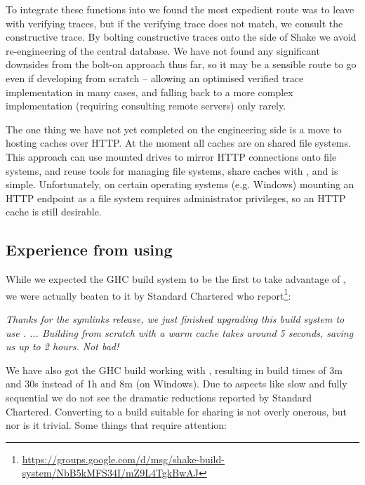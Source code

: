 To integrate these functions into \Shake we found the most expedient route was
to leave \Shake with verifying traces, but if the verifying trace does not
match, we consult the constructive trace. By bolting constructive traces onto
the side of Shake we avoid re-engineering of the central database. We have not
found any significant downsides from the bolt-on approach thus far, so it may be
a sensible route to go even if developing from scratch -- allowing an optimised
verified trace implementation in many cases, and falling back to a more complex
implementation (requiring consulting remote servers) only rarely.

The one thing we have not yet completed on the engineering side is a move to
hosting caches over HTTP. At the moment all caches are on shared file systems.
This approach can use mounted drives to mirror HTTP connections onto file
systems, and reuse tools for managing file systems, share caches with
, and is simple. Unfortunately, on certain operating systems (e.g.
Windows) mounting an HTTP endpoint as a file system requires administrator
privileges, so an HTTP cache is still desirable.

\subsection{Experience from using \Cloud \Shake}\label{sec-using-cloud-shake}

While we expected the GHC build system to be the first to take advantage of
\Cloud \Shake, we were actually beaten to it by Standard Chartered who
report\footnote{\url{https://groups.google.com/d/msg/shake-build-system/NbB5kMFS34I/mZ9L4TgkBwAJ}}:

\vspace{1mm}
\begin{center}
\parbox{0.8 \textwidth}{\emph{Thanks for the symlinks release, we just finished upgrading this build
system to use \cmd{-}. ... Building from scratch with a warm cache
takes around 5 seconds, saving us up to 2 hours. Not bad!}}
\end{center}
\vspace{1mm}

We have also got the GHC build working with \Cloud \Shake, resulting in build
times of 3m and 30s instead of 1h and 8m (on Windows). Due to aspects like slow
and fully sequential  we do not see the dramatic reductions
reported by Standard Chartered. Converting to a build suitable for sharing is
not overly onerous, but nor is it trivial. Some things that require attention:

